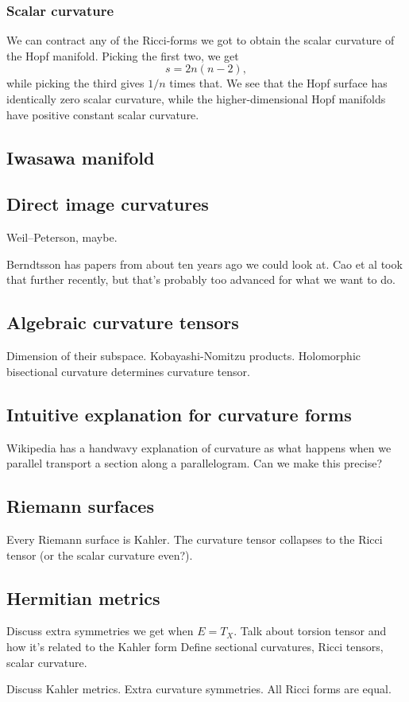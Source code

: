 \documentclass[11pt]{article}
\begin{document}
\subsubsection{Scalar curvature}
\label{sec:orgf9212d2}

We can contract any of the Ricci-forms we got to obtain the scalar curvature of the Hopf manifold. Picking the first two, we get
$$
s = 2n(n-2),
$$
while picking the third gives \(1/n\) times that. We see that the Hopf surface has identically zero scalar curvature, while the higher-dimensional Hopf manifolds have positive constant scalar curvature.


\subsection{Iwasawa manifold}
\label{sec:orgd67c2ff}

\subsection{Direct image curvatures}
\label{sec:org5619e67}

Weil--Peterson, maybe.

Berndtsson has papers from about ten years ago we could look at. Cao et al took that further recently, but that's probably too advanced for what we want to do.

\subsection{Algebraic curvature tensors}
\label{sec:orga0722e9}

Dimension of their subspace.
Kobayashi-Nomitzu products.
Holomorphic bisectional curvature determines curvature tensor.


\subsection{Intuitive explanation for curvature forms}
\label{sec:org2b43ecb}

Wikipedia has a handwavy explanation of curvature as what happens when we parallel transport a section along a parallelogram. Can we make this precise?


\subsection{Riemann surfaces}
\label{sec:org776713b}

Every Riemann surface is Kahler. The curvature tensor collapses to the Ricci tensor (or the scalar curvature even?).


\subsection{Hermitian metrics}
\label{sec:orgad8dbb1}

Discuss extra symmetries we get when \(E = T_X\).
Talk about torsion tensor and how it's related to the Kahler form
Define sectional curvatures, Ricci tensors, scalar curvature.

Discuss Kahler metrics. Extra curvature symmetries. All Ricci forms are equal.




\end{document}
